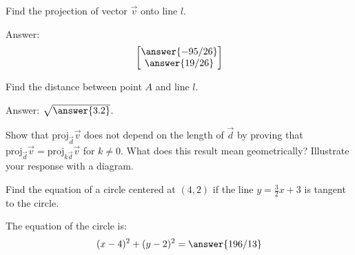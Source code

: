 \documentclass{ximera}
\begin{document}
\begin{problem}
Find the projection of vector $\vec{v}$ onto line $l$.

\begin{image}
\end{image}

Answer:
$$\begin{bmatrix}\answer{-95/26}\\\answer{19/26}\end{bmatrix}$$
\end{problem}
\begin{problem}
Find the distance between point $A$ and line $l$.

\begin{image}
\end{image}

Answer: $\sqrt{\answer{3.2}}$.
\end{problem}
\begin{problem}
Show that $\text{proj}_{\vec{d}}\vec{v}$ does not depend on the length of $\vec{d}$ by proving that $\text{proj}_{\vec{d}}\vec{v}=\text{proj}_{k\vec{d}}\vec{v}$ for $k\neq 0$.  What does this result mean geometrically?  Illustrate your response with a diagram.
\end{problem}
\begin{problem}
Find the equation of a circle centered at $(4, 2)$ if the line $y=\frac{3}{2}x+3$ is tangent to the circle.

The equation of the circle is:
$$(x-4)^2+(y-2)^2=\answer{196/13}$$
\end{problem}
\end{document}
